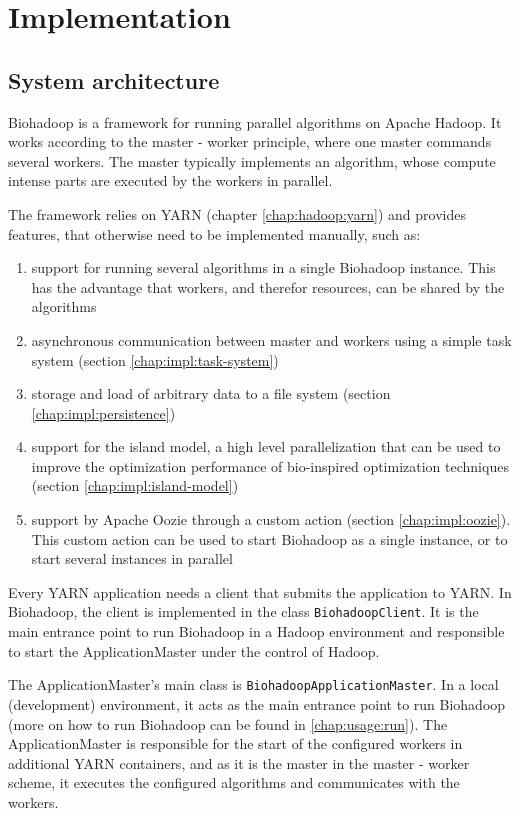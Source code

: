 \chapter{Implementation}
\label{chap:impl}

\section{System architecture}
\label{chap:impl:system-architecture}
  Biohadoop is a framework for running parallel algorithms on Apache Hadoop. It works according to the master - worker principle, where one master commands several workers. The master typically implements an algorithm, whose compute intense parts are executed by the workers in parallel.
  
  The framework relies on YARN (chapter \ref{chap:hadoop:yarn}) and provides features, that otherwise need to be implemented manually, such as:
  
  \begin{enumerate}
    \item support for running several algorithms in a single Biohadoop instance. This has the advantage that workers, and therefor resources, can be shared by the algorithms
    \item asynchronous communication between master and workers using a simple task system (section \ref{chap:impl:task-system})
    \item storage and load of arbitrary data to a file system (section \ref{chap:impl:persistence})
    \item support for the island model, a high level parallelization that can be used to improve the optimization performance of bio-inspired optimization techniques (section \ref{chap:impl:island-model})
    \item support by Apache Oozie through a custom action (section \ref{chap:impl:oozie}). This custom action can be used to start Biohadoop as a single instance, or to start several instances in parallel
  \end{enumerate}
  
  Every YARN application needs a client that submits the application to YARN. In Biohadoop, the client is implemented in the class \texttt{BiohadoopClient}. It is the main entrance point to run Biohadoop in a Hadoop environment and responsible to start the ApplicationMaster under the control of Hadoop.
  
  The ApplicationMaster's main class is \texttt{BiohadoopApplicationMaster}. In a local (development) environment, it acts as the main entrance point to run Biohadoop (more on how to run Biohadoop can be found in \ref{chap:usage:run}). The ApplicationMaster is responsible for the start of the configured workers in additional YARN containers, and as it is the master in the master - worker scheme, it executes the configured algorithms and communicates with the workers.
  
